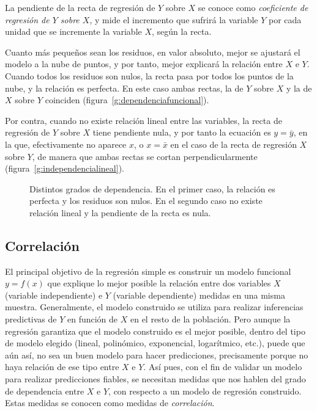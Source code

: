 La pendiente de la recta de regresión de $Y$ sobre $X$ se conoce como
\emph{coeficiente de regresión de $Y$ sobre $X$}, y mide el incremento que sufrirá
la variable $Y$ por cada unidad que se incremente la variable $X$, según la recta.

Cuanto más pequeños sean los residuos, en valor absoluto, mejor se ajustará el modelo a la nube de
puntos, y por tanto, mejor explicará la relación entre $X$ e $Y$. Cuando todos
los residuos son nulos, la recta pasa por todos los puntos de la nube, y la
relación es perfecta. En este caso ambas rectas, la de $Y$ sobre $X$ y la de
$X$ sobre $Y$ coinciden (figura~\ref{g:dependenciafuncional}).

Por contra, cuando no existe relación lineal entre las variables, la recta de
regresión de $Y$ sobre $X$ tiene pendiente nula, y por tanto la
ecuación es $y=\bar y$, en la que, efectivamente no aparece $x$, o $x=\bar x$
en el caso de la recta de regresión $X$ sobre $Y$, de manera que ambas rectas
se cortan perpendicularmente (figura~\ref{g:independencialineal}).

\begin{figure}[htbp]
\centering 
{}\qquad
{}
\caption{Distintos grados de dependencia. En el primer caso, la relación es perfecta
y los residuos son nulos. En el segundo caso no existe relación lineal y la
pendiente de la recta es nula.}
\end{figure}


\subsection{Correlación}
El principal objetivo de la regresión simple es construir un modelo funcional
$y=f(x)$ que explique lo mejor posible la relación entre dos variables $X$
(variable independiente) e $Y$ (variable dependiente) medidas en una misma
muestra. Generalmente, el modelo construido se utiliza para realizar
inferencias predictivas de $Y$ en función de $X$ en el resto de la población.
Pero aunque la regresión garantiza que el modelo construido es el mejor
posible, dentro del tipo de modelo elegido (lineal, polinómico, exponencial,
logarítmico, etc.), puede que aún así, no sea un buen modelo para hacer
predicciones, precisamente porque no haya relación de ese tipo entre $X$ e
$Y$. Así pues, con el fin de validar un modelo para realizar predicciones
fiables, se necesitan medidas que nos hablen del grado de dependencia entre $X$ e
$Y$, con respecto a un modelo de regresión construido. Estas medidas se conocen
como medidas de \emph{correlación}.

